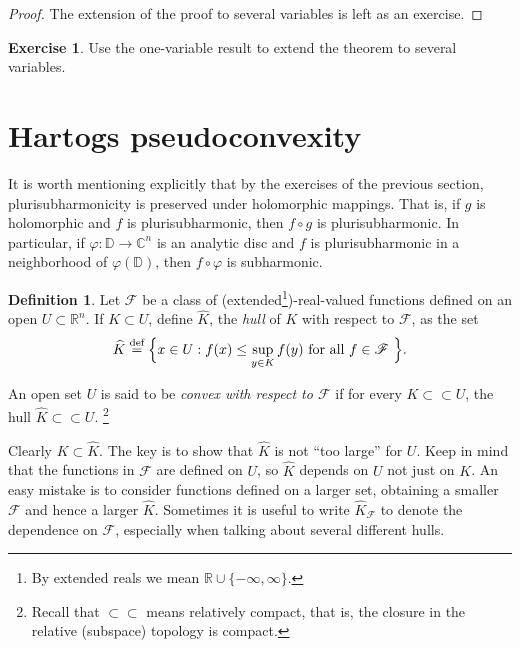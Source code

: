\documentclass[12pt,openany]{book}
\newcommand{\C}{{\mathbb{C}}}
\newcommand{\R}{{\mathbb{R}}}
\newcommand{\D}{{\mathbb{D}}}
\newcommand{\sF}{{\mathscr{F}}}
\newcommand{\myindex}[1]{#1\index{#1}}
\theoremstyle{plain}
\theoremstyle{remark}
\theoremstyle{definition}
\newtheorem{defn}[thm]{Definition}
\newenvironment{exbox}{%
    \def\FrameCommand{\vrule width 1pt \relax\hspace {10pt}}%
    \MakeFramed {\advance \hsize -\width \FrameRestore }%
}{%
    \endMakeFramed
}
\theoremstyle{exercise}
\newtheorem{exercise}{Exercise}[section]
\theoremstyle{example}
\begin{document}
\begin{proof}
The extension of the proof to several variables is left as an exercise.
\end{proof}

\begin{exbox}
\begin{exercise}
Use the one-variable result to extend the theorem to several variables.
\end{exercise}
\end{exbox}


\section{Hartogs pseudoconvexity}

It is worth mentioning explicitly that by the
exercises of the previous section,
plurisubharmonicity is preserved under holomorphic mappings.
That is, if $g$ is holomorphic and $f$ is plurisubharmonic, then
$f \circ g$ is plurisubharmonic.  In particular, if $\varphi \colon \D \to
\C^n$ is an analytic disc and $f$ is plurisubharmonic in a neighborhood of
$\varphi(\D)$,
then $f \circ \varphi$ is subharmonic.

\begin{defn}
Let $\sF$ be a class of (extended\footnote{%
By extended reals we mean $\R \cup \{ -\infty,\infty\}$.})-real-valued
functions defined on an open $U \subset \R^n$.  If $K
\subset U$, define $\widehat{K}$, the \emph{\myindex{hull}} of $K$ with
respect to $\sF$, as the set
%
\begin{equation*}
\widehat{K} \overset{\text{def}}{=} \Bigl\{ x \in U : f(x) \leq \sup_{y\in K} f(y)
\text{ for all $f \in \sF$ } \Bigr\} .
\end{equation*}

An open set $U$ is said to be \emph{convex with respect to $\sF$}\index{convex!with respect to $\sF$}
if for every $K \subset \subset U$, the hull $\widehat{K} \subset \subset U$.%
\footnote{Recall that $\subset \subset$ means relatively compact, that is,
the closure in the relative (subspace) topology is compact.}
\end{defn}

Clearly $K \subset \widehat{K}$.  The key is to show that $\widehat{K}$
is not ``too large'' for $U$.
Keep in mind that the functions in $\sF$ are defined on $U$, so $\widehat{K}$
depends on $U$ not just on $K$.  An easy mistake is to consider functions defined
on a larger set, obtaining a smaller $\sF$ and hence a larger
$\widehat{K}$.  Sometimes it is useful to write $\widehat{K}_{\sF}$ to
denote the dependence on $\sF$, especially when talking about several different
hulls.
\end{document}
